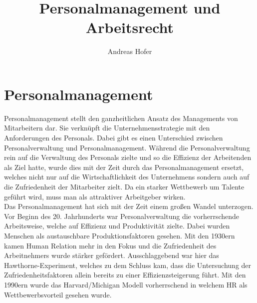 \documentclass{article}
\title{\vspace{-1cm}Personalmanagement und Arbeitsrecht}
\author{Andreas Hofer}
\begin{document}
	\maketitle
	\tableofcontents
	\section{Personalmanagement}
	Personalmanagement stellt den ganzheitlichen Ansatz des Managements von Mitarbeitern dar. Sie verknüpft die Unternehmensstrategie mit den Anforderungen des Personals. Dabei gibt es einen Unterschied zwischen Personalverwaltung und Personalmanagement. Während die Personalverwaltung rein auf die Verwaltung des Personals zielte und so die Effizienz der Arbeitenden als Ziel hatte, wurde dies mit der Zeit durch das Personalmanagement ersetzt, welches nicht nur auf die Wirtschaftlichkeit des Unternehmens sondern auch auf die Zufriedenheit der Mitarbeiter zielt. Da ein starker Wettbewerb um Talente geführt wird, muss man als attraktiver Arbeitgeber wirken. \\
	Das Personalmanagement hat sich mit der Zeit einem großen Wandel unterzogen. Vor Beginn des 20. Jahrhunderts war Personalverwaltung die vorherrschende Arbeitsweise, welche auf Effizienz und Produktivität zielte. Dabei wurden Menschen als austauschbare Produktionsfaktoren gesehen. Mit den 1930ern kamen Human Relation mehr in den Fokus und die Zufriedenheit des Arbeitnehmers wurde stärker gefördert. Ausschlaggebend war hier das Hawthorne-Experiment, welches zu dem Schluss kam, dass die Untersuchung der Zufriedenheitsfaktoren allein bereits zu einer Effizienzsteigerung führt. Mit den 1990ern wurde das Harvard/Michigan Modell vorherrschend in welchem HR als Wettbewerbsvorteil gesehen wurde. \\
\end{document}
